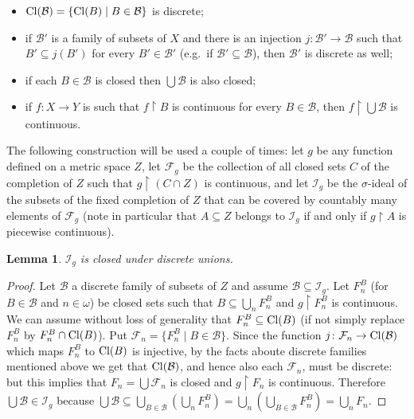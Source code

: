 \documentclass{rae}
\def\Cl{{\rm Cl}}
\newcommand{\F}{\mathcal{F}}
\newcommand{\B}{\mathcal{B}}
\newcommand{\I}{\mathcal{I}}
\newcommand{\restr}[2]{#1 \restriction #2}
\newtheorem{lemma}[theorem]{Lemma}
\theoremstyle{definition}
\begin{document}
\begin{itemize}
\item $\Cl(\B) = \{ \Cl(B) \mid B \in \B \}$ is discrete;
\item if $\B'$ is a family of subsets of $X$ and there is an injection
  $j \colon \B' \to \B$ such that $B' \subseteq j(B')$ for every $B'
\in \B'$ (e.g.\ if $\B' \subseteq \B$), then $\B'$ is discrete as well;
\item if each $B \in \B$ is closed then $\bigcup \B$ is also closed;
\item if $f \colon X \to Y$ is such that $\restr{f}{B}$ is continuous
  for every $B \in \B$, then $\restr{f}{\bigcup \B}$ is continuous. 
\end{itemize}

The following construction will be used a couple of times: let $g$ be any function defined on a metric space $Z$, let $\F_g$ be the collection of all closed sets $C$ of the completion of $Z$ such that $\restr{g}{(C \cap Z)}$ is continuous, and let $\I_g$\label{I} be the $\sigma$-ideal of the subsets of the fixed completion of $Z$ that can be covered by countably many elements of $\F_g$ (note in particular that $A \subseteq Z$ belongs to $\I_g$ if and only if $\restr{g}{A}$ is piecewise continuous).

\begin{lemma}\label{lemmadiscrete}
  $\I_g$ is closed under discrete unions.
\end{lemma}

\begin{proof}
Let $\B$ a discrete family of subsets of $Z$ and assume $\B \subseteq
\I_g$. Let $F^B_n$ (for $B \in \B$ and $n \in \omega$) be closed sets
such that $B \subseteq \bigcup_n F^B_n$ and $\restr{g}{F^B_n}$ is
continuous. We can assume without loss of generality that $F^B_n
\subseteq \Cl(B)$ (if not simply replace $F^B_n$ by $F^B_n \cap
\Cl(B)$). Put $\F_n = \{ F^B_n \mid B \in \B\}$. Since the function $j
\colon \F_n \to \Cl(\B)$ which maps $F^B_n$ to $\Cl(B)$ is injective, by
the facts aboute discrete families mentioned above we get that
$\Cl(\B)$, and hence also each $\F_n$, must be discrete: but this
implies that $F_n = \bigcup \F_n$ is closed and $\restr{g}{F_n}$ is
continuous. Therefore $\bigcup \B \in \I_g$ because $\bigcup \B
\subseteq \bigcup_{B \in \B} \left( \bigcup_n F^B_n \right) =
\bigcup_n \left( \bigcup_{B \in \B} F^B_n \right) = \bigcup_n F_n$.
\end{proof}
\end{document}
